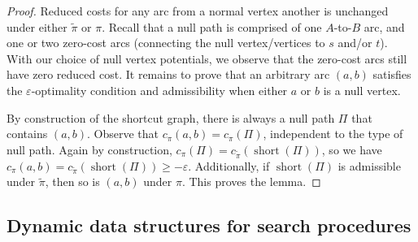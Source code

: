 \documentclass[a4paper,UKenglish]{socg-lipics-v2018}
\makeatletter
\def\eps{\varepsilon}
\def\short{\operatorname{short}}
\theoremstyle{plain}
\numberwithin{figure}{section}
\def\n@te#1{\textsf{\boldmath \textbf{$\langle\!\langle$#1$\rangle\!\rangle$}}\leavevmode}
\def\note#1{\textcolor{red}{\n@te{#1}}}
\renewcommand{\note}[1]{} %
\makeatother
\begin{document}
\begin{proof}
Reduced costs for any arc from a normal vertex another is unchanged under either
$\tilde{\pi}$ or $\pi$.
Recall that a null path is comprised of one $A$-to-$B$ arc, and one or two
zero-cost arcs (connecting the null vertex/vertices to $s$ and/or $t$).
With our choice of null vertex potentials, we observe that the zero-cost arcs
still have zero reduced cost.
It remains to prove that an arbitrary \note{residual?} arc $(a, b)$ \note{arc or directed edge?} satisfies the $\eps$-optimality condition and admissibility when either $a$ or $b$ is a null vertex.

By construction of the shortcut graph,
there is always a null path $\Pi$ that contains $(a, b)$.
Observe that $c_\pi(a, b) = c_\pi(\Pi)$, independent to the type of null path.
Again by construction, $c_\pi(\Pi) = c_{\tilde{\pi}}(\short(\Pi))$, so we have
$c_\pi(a, b) = c_{\tilde{\pi}}(\short(\Pi)) \geq -\eps$.
Additionally, if $\short(\Pi)$ is admissible under $\tilde{\pi}$, then so is
$(a, b)$ under $\pi$.
%
This proves the lemma.
\end{proof}


\subsection{Dynamic data structures for search procedures}
\label{SS:ds-search}
\end{document}
